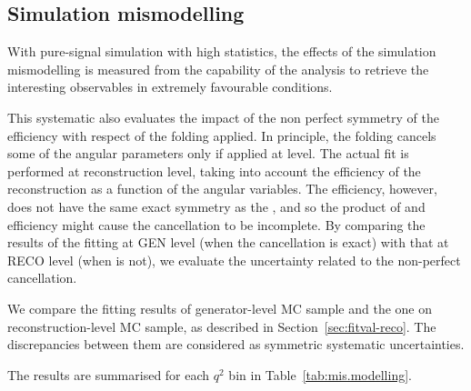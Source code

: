 


\subsection{Simulation mismodelling}
\label{sec:sys-mismodel}

With pure-signal simulation with high statistics, the effects of the simulation mismodelling is measured from the capability of the analysis to retrieve the interesting observables in extremely favourable conditions.

This systematic also evaluates the impact of the non perfect symmetry of the efficiency with respect of the folding applied.
In principle, the folding cancels some of the angular parameters only if applied at \pdf level.
The actual fit is performed at reconstruction level, taking into account the efficiency of the reconstruction as a function of the angular variables.
The efficiency, however, does not have the same exact symmetry as the \pdf, and so the product of \pdf and efficiency might cause the cancellation to be incomplete.
By comparing the results of the fitting at GEN level (when the cancellation is exact) with that at RECO level (when is not), we evaluate the uncertainty related to the non-perfect cancellation.

We compare the fitting results of generator-level MC sample and the one on reconstruction-level MC sample, as described in Section~\ref{sec:fitval-reco}.
The discrepancies between them are considered as symmetric systematic uncertainties.

The results are summarised for each $q^2$ bin in Table~\ref{tab:mis.modelling}.

